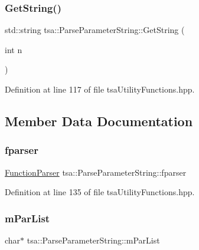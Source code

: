 \subsubsection{\texorpdfstring{Get\+String()}{GetString()}}
{\footnotesize\ttfamily std\+::string tsa\+::\+Parse\+Parameter\+String\+::\+Get\+String (\begin{DoxyParamCaption}\item[{int}]{n }\end{DoxyParamCaption})\hspace{0.3cm}{\ttfamily [inline]}}



Definition at line 117 of file tsa\+Utility\+Functions.\+hpp.



\subsection{Member Data Documentation}
\mbox{\label{classtsa_1_1_parse_parameter_string_ab2648c4056632b436348effef55e73e5}} 
\subsubsection{\texorpdfstring{fparser}{fparser}}
{\footnotesize\ttfamily \hyperlink{class_function_parser}{Function\+Parser} tsa\+::\+Parse\+Parameter\+String\+::fparser\hspace{0.3cm}{\ttfamily [private]}}



Definition at line 135 of file tsa\+Utility\+Functions.\+hpp.

\mbox{\label{classtsa_1_1_parse_parameter_string_aa90c11badf0c45d4efc7e2dd2c912100}} 
\subsubsection{\texorpdfstring{m\+Par\+List}{mParList}}
{\footnotesize\ttfamily char$\ast$ tsa\+::\+Parse\+Parameter\+String\+::m\+Par\+List\hspace{0.3cm}{\ttfamily [private]}}



